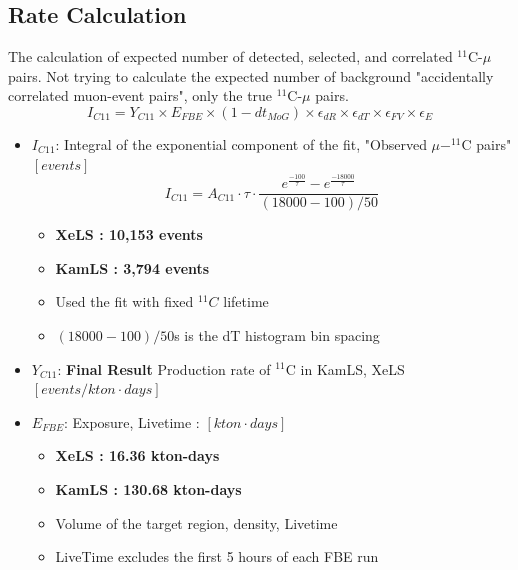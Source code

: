 \documentclass[12pt,letterpaper]{article}
\begin{document}
\subsection*{Rate Calculation}
The calculation of expected number of detected, selected, and correlated $^{11}$C-$\mu$ pairs. Not trying to calculate the expected number of background "accidentally correlated muon-event pairs", only the true $^{11}$C-$\mu$ pairs.
\begin{equation}
	I_{C11} = Y_{C11}\times E_{FBE} \times (1-dt_{MoG}) \times \epsilon_{dR} \times \epsilon_{dT} \times \epsilon_{FV} \times \epsilon_{E}
\end{equation}
\begin{itemize}
	\item $I_{C11}$: Integral of the exponential component of the fit, "Observed $\mu-^{11}$C pairs"  $[events]$
	\begin{equation}
		I_{C11} = A_{C11}\cdot \tau\cdot \frac{e^{\frac{-100}{\tau}}-e^{\frac{-18000}{\tau}}}{(18000-100)/50}
	\end{equation}
	\begin{itemize}
		\item \textbf{XeLS  : 10,153 events}
		\item \textbf{KamLS : 3,794 events}
		\item Used the fit with fixed $^{11}C$ lifetime
		\item $(18000-100)/50 $s is the dT histogram bin spacing
	\end{itemize}
	\item $Y_{C11}$: \textbf{Final Result} Production rate of $^{11}$C in KamLS, XeLS $[events/kton\cdot days]$
	\item $E_{FBE}$: Exposure, Livetime : $[kton\cdot days]$
	\begin{itemize}
		\item \textbf{XeLS : 16.36 kton-days} 
		\item \textbf{KamLS : 130.68 kton-days}
		\item Volume of the target region, density, Livetime
		\item LiveTime excludes the first 5 hours of each FBE run
	\end{itemize}

\end{itemize}
\end{document}
